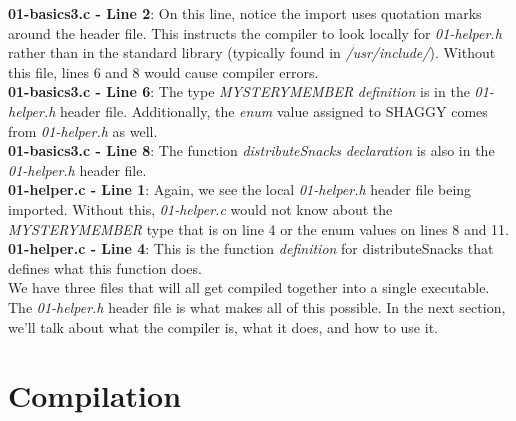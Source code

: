 \documentclass[../main.tex]{subfiles}
\begin{document}


\textbf{01-basics3.c - Line 2}: On this line, notice the import uses quotation marks around the header file.  This instructs the compiler to look locally for \textit{01-helper.h} rather than in the standard library (typically found in \textit{/usr/include/}).  Without this file, lines 6 and 8 would cause compiler errors.\\
\textbf{01-basics3.c - Line 6}: The type \textit{MYSTERYMEMBER} \textit{definition} is in the \textit{01-helper.h} header file.  Additionally, the \textit{enum} value assigned to SHAGGY comes from \textit{01-helper.h} as well.\\
\textbf{01-basics3.c - Line 8}: The function \textit{distributeSnacks} \textit{declaration} is also in the \textit{01-helper.h} header file.\\



\textbf{01-helper.c - Line 1}:  Again, we see the local \textit{01-helper.h} header file being imported.  Without this, \textit{01-helper.c} would not know about the \textit{MYSTERYMEMBER} type that is on line 4  or the enum values on lines 8 and 11.\\
\textbf{01-helper.c - Line 4}:  This is the function \textit{definition} for distributeSnacks that defines what this function does.\\

We have three files that will all get compiled together into a single executable.  The \textit{01-helper.h} header file is what makes all of this possible.  In the next section, we'll talk about what the compiler is, what it does, and how to use it.

\section{Compilation}
\end{document}
